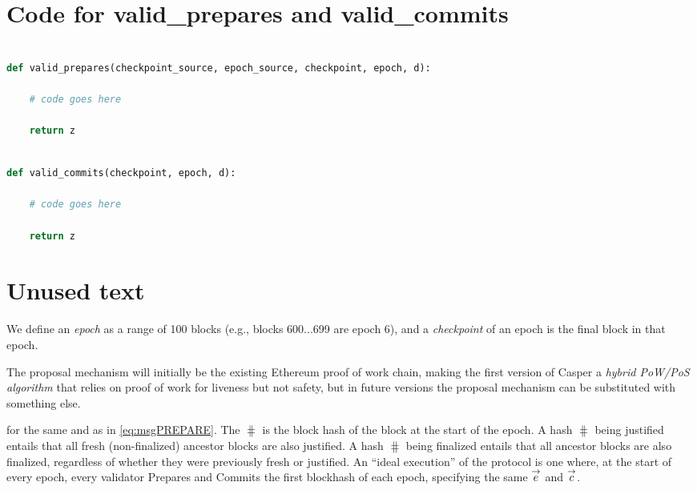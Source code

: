 \appendix
\clearpage


\section{Code for valid\_prepares and valid\_commits}

\begin{lstlisting}[language=Python, caption={Algorithm for counting up the prepare portion behind a checkpoint. \todo{fill this in}}, captionpos=b, label={alg:validprepare}]

def valid_prepares(checkpoint_source, epoch_source, checkpoint, epoch, d):
    
    # code goes here
    
    return z

\end{lstlisting}



\begin{lstlisting}[language=Python, caption={Algorithm for counting up the commit portion behind a checkpoint. \todo{fill this in} }, captionpos=b, label={alg:validprepare}]

def valid_commits(checkpoint, epoch, d):
    
    # code goes here
    
    return z

\end{lstlisting}

\section{Unused text}




We define an \textit{epoch} as a range of 100 blocks (e.g., blocks 600...699 are epoch 6), and a \textit{checkpoint} of an epoch is the final block in that epoch. 

The proposal mechanism will initially be the existing Ethereum proof of work chain, making the first version of Casper a \textit{hybrid PoW/PoS algorithm} that relies on proof of work for liveness but not safety, but in future versions the proposal mechanism can be substituted with something else.



for the same \epoch and \hash as in \eqref{eq:msgPREPARE}.  The $\hash$ is the block hash of the block at the start of the epoch.  A hash $\hash$ being justified entails that all fresh (non-finalized) ancestor blocks are also justified.  A hash $\hash$ being finalized entails that all ancestor blocks are also finalized, regardless of whether they were previously fresh or justified.  An ``ideal execution'' of the protocol is one where, at the start of every epoch, every validator Prepares and Commits the first blockhash of each epoch, specifying the same $\overset{\rightarrow}{e}\space$ and $\overset{\rightarrow}{c}$.

